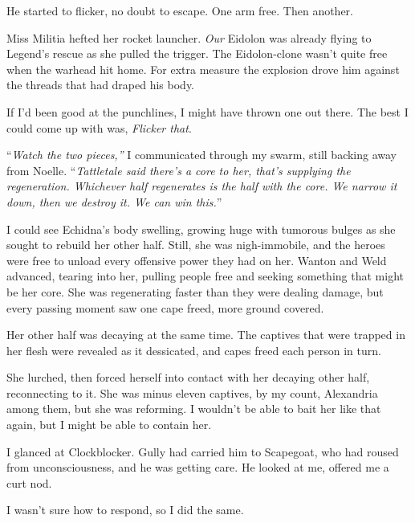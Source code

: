 He started to flicker, no doubt to escape.  One arm free.  Then another.



Miss Militia hefted her rocket launcher.  \emph{Our }Eidolon was already flying to Legend's rescue as she pulled the trigger.  The Eidolon-clone wasn't quite free when the warhead hit home.  For extra measure the explosion drove him against the threads that had draped his body.



If I'd been good at the punchlines, I might have thrown one out there.  The best I could come up with was, \emph{Flicker that}.



``\emph{Watch the two pieces,'' }I communicated through my swarm, still backing away from Noelle.  ``\emph{Tattletale said there's a core to her, that's supplying the regeneration.  Whichever half regenerates is the half with the core.  We narrow it down, then we destroy it.  We can win this.}''



I could see Echidna's body swelling, growing huge with tumorous bulges as she sought to rebuild her other half.  Still, she was nigh-immobile, and the heroes were free to unload every offensive power they had on her.  Wanton and Weld advanced, tearing into her, pulling people free and seeking something that might be her core.  She was regenerating faster than they were dealing damage, but every passing moment saw one cape freed, more ground covered.



Her other half was decaying at the same time.  The captives that were trapped in her flesh were revealed as it dessicated, and capes freed each person in turn.



She lurched, then forced herself into contact with her decaying other half, reconnecting to it.  She was minus eleven captives, by my count, Alexandria among them, but she was reforming.  I wouldn't be able to bait her like that again, but I might be able to contain her.



I glanced at Clockblocker.  Gully had carried him to Scapegoat, who had roused from unconsciousness, and he was getting care.  He looked at me, offered me a curt nod.



I wasn't sure how to respond, so I did the same.




